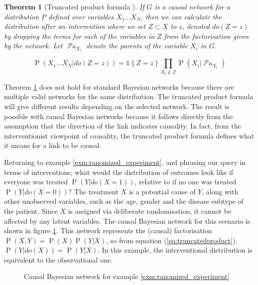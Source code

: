 \documentclass[11pt,a4paper,twoside]{report}
\newcommand{\set}[1]{\left\{#1\right\}}
\newcommand{\ind}[1]{\mathds{1}\!\!\set{#1}}
\renewcommand{\P}[1]{\operatorname{P}\left(#1\right)}
\newcommand{\parents}[1]{\operatorname{\mathcal{P}a}_{#1}}
\theoremstyle{plain}
\newtheorem{theorem}{Theorem}
\theoremstyle{definition}
\begin{document}
\vspace{0.5cm}
\begin{theorem}[Truncated product formula \citep{Pearl2000}]
\label{thm:truncated_prodcut}
If $G$ is a causal network for a distribution $P$ defined over variables $X_{1}...X_{N}$, then we can calculate the distribution after an intervention where we set $Z \subset X$ to $z$, denoted $do(Z=z)$ by dropping the terms for each of the variables in $Z$ from the factorisation given by the network. Let $\parents{X_i}$ denote the parents of the variable $X_i$ in $G$.

\begin{equation}
\label{eq:truncatedproduct}
\P{X_1...X_N|do(Z=z)} = \ind{Z = z}
  \prod_{X_i \notin Z}\P{X_{i}|\parents{X_i}}
\end{equation}
\end{theorem}


Theorem \ref{thm:truncated_prodcut} does not hold for standard Bayesian networks because there are multiple valid networks for the same distribution. The truncated product formula will give different results depending on the selected network. The result is possible with causal Bayesian networks because it follows directly from the assumption that the direction of the link indicates causality. In fact, from the interventionist viewpoint of causality, the truncated product formula defines what it means for a link to be causal. 


Returning to example \ref{exm:ranomized_experiment}, and phrasing our query in terms of interventions; what would the distribution of outcomes look like if everyone was treated $\P{Y|do(X=1)}$, relative to if no one was treated $\P{Y|do(X=0)}$? The treatment $X$ is a potential cause of $Y$, along with other unobserved variables, such as the age, gender and the disease subtype of the patient. Since $X$ is assigned via deliberate randomisation, it cannot be affected by any latent variables. The causal Bayesian network for this scenario is shown in figure \ref{fig:causal_network_example}. This network represents the (causal) factorisation  $\P{X,Y} = \P{X}\P{Y|X}$, so from equation (\ref{eq:truncatedproduct}), $\P{Y|do(X)} = \P{Y|X}$. In this example, the interventional distribution is equivalent to the observational one.

\begin{figure}[ht]
\centering
{}
\caption{Causal Bayesian network for example \ref{exm:ranomized_experiment}}
\label{fig:causal_network_example}
\end{figure}
\end{document}
